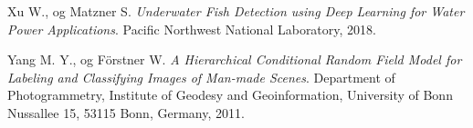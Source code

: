 \documentclass[11ot]{article}
\begin{document}
\begin{thebibliography}{9}
Xu W., og Matzner S. 
\textit{Underwater Fish Detection using Deep Learning for Water Power Applications}. 
Pacific Northwest National Laboratory, 2018.

Yang M. Y., og Förstner W. 
\textit{A Hierarchical Conditional Random Field Model for Labeling and Classifying Images of Man-made Scenes}. 
Department of Photogrammetry, Institute of Geodesy and Geoinformation, University of Bonn Nussallee 15, 53115 Bonn, Germany, 2011.


\end{thebibliography}


%
%
\end{document}
